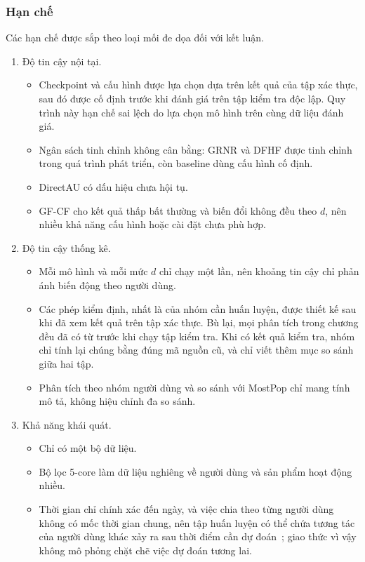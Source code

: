 \subsubsection{Hạn chế}
\label{sec:limitations}
 Các hạn chế được sắp theo loại mối đe dọa đối với kết luận.
\begin{enumerate}
\item Độ tin cậy nội tại.
  \begin{itemize}
  \item Checkpoint và cấu hình được lựa chọn dựa trên kết quả của tập xác thực, sau đó được cố định trước khi đánh giá trên tập kiểm tra độc lập. Quy trình này hạn chế sai lệch do lựa chọn mô hình trên cùng dữ liệu đánh giá.
  \item Ngân sách tinh chỉnh không cân bằng: GRNR và DFHF được tinh chỉnh trong quá trình phát triển, còn baseline dùng cấu hình cố định.
  \item DirectAU có dấu hiệu chưa hội tụ.
  \item GF-CF cho kết quả thấp bất thường và biến đổi không đều theo $d$, nên nhiều khả năng cấu hình hoặc cài đặt chưa phù hợp.
  \end{itemize}
\item Độ tin cậy thống kê.
  \begin{itemize}
  \item Mỗi mô hình và mỗi mức $d$ chỉ chạy một lần, nên khoảng tin cậy chỉ phản ánh biến động theo người dùng.
  \item Các phép kiểm định, nhất là của nhóm cần huấn luyện, được thiết kế sau khi đã xem kết quả trên tập xác thực. Bù lại, mọi phân tích trong chương đều đã có từ trước khi chạy tập kiểm tra. Khi có kết quả kiểm tra, nhóm chỉ tính lại chúng bằng đúng mã nguồn cũ, và chỉ viết thêm mục so sánh giữa hai tập.
  \item Phân tích theo nhóm người dùng và so sánh với MostPop chỉ mang tính mô tả, không hiệu chỉnh đa so sánh.
  \end{itemize}
\item Khả năng khái quát.
  \begin{itemize}
  \item Chỉ có một bộ dữ liệu.
  \item Bộ lọc 5-core làm dữ liệu nghiêng về người dùng và sản phẩm hoạt động nhiều.
  \item Thời gian chỉ chính xác đến ngày, và việc chia theo từng người dùng không có mốc thời gian chung, nên tập huấn luyện có thể chứa tương tác của người dùng khác xảy ra sau thời điểm cần dự đoán~\cite{ji2023leakage}; giao thức vì vậy không mô phỏng chặt chẽ việc dự đoán tương lai.

\end{itemize}
\end{enumerate}
